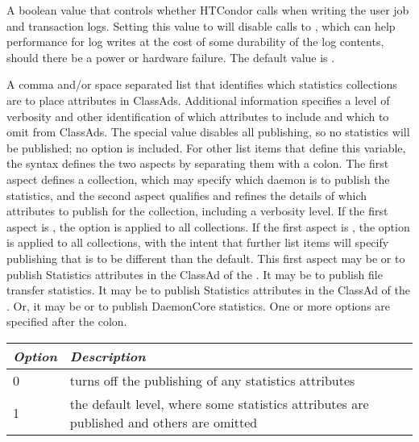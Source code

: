 \begin{description}
\label{param:CondorFsync}
\item[\Macro{CONDOR\_FSYNC}]
  A boolean value that controls whether HTCondor calls  when
  writing the user job and transaction logs.  
  Setting this value to 
  will disable calls to , 
  which can help performance for 
  log writes at the cost of some durability of the log contents,
  should there be a power or hardware failure.  
  The default value is .

\label{param:StatisticsToPublish}
\item[\Macro{STATISTICS\_TO\_PUBLISH}]
  A comma and/or space separated list that identifies which 
  statistics collections are to place attributes in ClassAds. 
  Additional information specifies a level of
  verbosity and other identification of which attributes to include 
  and which to omit from ClassAds. 
  The special value  disables all publishing, so no statistics
  will be published; no option is included.
  For other list items that define this variable,
  the syntax defines the two aspects by separating them with a colon.
  The first aspect defines a collection, 
  which may specify which daemon is to publish the statistics,
  and the second aspect qualifies and refines the details of which attributes 
  to publish for the collection, including a verbosity level.
  If the first aspect is ,
  the option is applied to all collections.
  If the first aspect is ,
  the option is applied to all collections, 
  with the intent that further list items will specify publishing that
  is to be different than the default.
  This first aspect may be  or  to publish
  Statistics attributes in the ClassAd of the .
  It may be  to publish file transfer statistics.
  It may be  to publish
  Statistics attributes in the ClassAd of the .
  Or, it may be  or  to publish 
  DaemonCore statistics.  
  One or more options are specified after the colon.
\begin{center}
\begin{table}[hbt]
\begin{tabular}{|p{2cm}p{12cm}|} \hline
\emph{Option} & \emph{Description} \\ \hline \hline
0 & turns off the publishing of any statistics attributes \\ \hline
1 & the default level, where some statistics attributes
  are published and others are omitted \\ \hline

\end{tabular}
\end{table}
\end{center}
\end{description}
